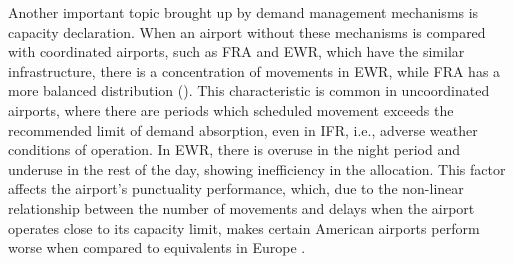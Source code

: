 Another important topic brought up by demand management mechanisms is capacity
declaration.
%
When an airport without these mechanisms is compared with coordinated airports,
such as \acrfull{FRA} and \acrfull{EWR}, which have the similar infrastructure,
there is a concentration of movements in \acrshort{EWR}, while \acrshort{FRA}
has a more balanced distribution ().
%
This characteristic is common in uncoordinated airports, where there are periods
which scheduled movement exceeds the recommended limit of demand absorption,
even in \acrfull{IFR}, i.e., adverse weather conditions of operation.
%
In \acrshort{EWR}, there is overuse in the night period and underuse in the rest
of the day, showing inefficiency in the allocation.
%
This factor affects the airport's punctuality performance, which, due to the
non-linear relationship between the number of movements and delays when the
airport operates close to its capacity limit, makes certain American airports
perform worse when compared to equivalents in Europe \cite{gillen2016airport}.



%





